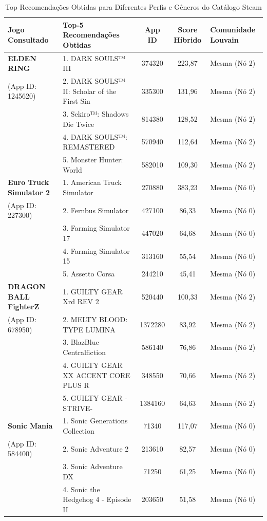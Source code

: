 \documentclass[conference]{IEEEtran}
\begin{document}
\begin{table}[htbp]
\caption{Top Recomendações Obtidas para Diferentes Perfis e Gêneros do Catálogo Steam}
\centering
\begin{tabular}{l l c c l}
\toprule
\textbf{Jogo Consultado} & \textbf{Top-5 Recomendações Obtidas} & \textbf{App ID} & \textbf{Score Híbrido} & \textbf{Comunidade Louvain} \\
\midrule
\textbf{ELDEN RING} & 1. DARK SOULS™ III & 374320 & 223,87 & Mesma (Nó 2) \\
(App ID: 1245620) & 2. DARK SOULS™ II: Scholar of the First Sin & 335300 & 131,96 & Mesma (Nó 2) \\
& 3. Sekiro™: Shadows Die Twice & 814380 & 128,52 & Mesma (Nó 2) \\
& 4. DARK SOULS™: REMASTERED & 570940 & 112,64 & Mesma (Nó 2) \\
& 5. Monster Hunter: World & 582010 & 109,30 & Mesma (Nó 2) \\
\midrule
\textbf{Euro Truck Simulator 2} & 1. American Truck Simulator & 270880 & 383,23 & Mesma (Nó 0) \\
(App ID: 227300) & 2. Fernbus Simulator & 427100 & 86,33 & Mesma (Nó 0) \\
& 3. Farming Simulator 17 & 447020 & 64,68 & Mesma (Nó 0) \\
& 4. Farming Simulator 15 & 313160 & 55,54 & Mesma (Nó 0) \\
& 5. Assetto Corsa & 244210 & 45,41 & Mesma (Nó 0) \\
\midrule
\textbf{DRAGON BALL FighterZ} & 1. GUILTY GEAR Xrd REV 2 & 520440 & 100,33 & Mesma (Nó 2) \\
(App ID: 678950) & 2. MELTY BLOOD: TYPE LUMINA & 1372280 & 83,92 & Mesma (Nó 2) \\
& 3. BlazBlue Centralfiction & 586140 & 76,86 & Mesma (Nó 2) \\
& 4. GUILTY GEAR XX ACCENT CORE PLUS R & 348550 & 70,66 & Mesma (Nó 2) \\
& 5. GUILTY GEAR -STRIVE- & 1384160 & 64,63 & Mesma (Nó 2) \\
\midrule
\textbf{Sonic Mania} & 1. Sonic Generations Collection & 71340 & 117,07 & Mesma (Nó 0) \\
(App ID: 584400) & 2. Sonic Adventure 2 & 213610 & 82,57 & Mesma (Nó 0) \\
& 3. Sonic Adventure DX & 71250 & 61,25 & Mesma (Nó 0) \\
& 4. Sonic the Hedgehog 4 - Episode II & 203650 & 51,58 & Mesma (Nó 0) \\

\end{tabular}
\end{table}
\end{document}
